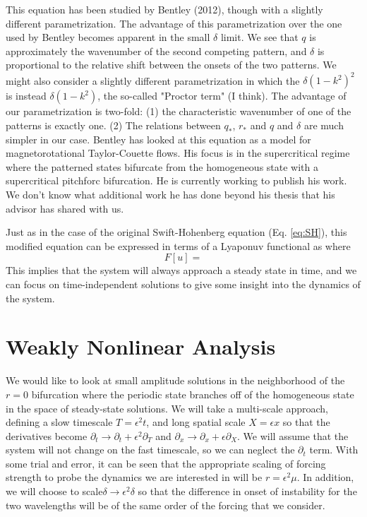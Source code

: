 \documentclass[api,pof,pre,12pt,a4paper]{revtex4-1}
\newcommand{\beqn}{\begin{equation}}
\newcommand{\eeqn}{\end{equation}}
\begin{document}
This equation has been studied by Bentley (2012), though with a slightly different parametrization.  The advantage of this parametrization over the one used by Bentley becomes apparent in the small $\delta$ limit.  We see that $q$ is approximately the wavenumber of the second competing pattern, and $\delta$ is proportional to the relative shift between the onsets of the two patterns.   We might also consider a slightly different parametrization in which the $\delta (1-k^2)^2$ is instead $\delta (1-k^2)$, the so-called "Proctor term" (I think).  The advantage of our parametrization is two-fold: (1) the characteristic wavenumber of one of the patterns is exactly one. (2) The relations between $q_*$, $r_*$ and $q$ and $\delta$ are much simpler in our case.    Bentley has looked at this equation as a model for magnetorotational Taylor-Couette flows.  His focus is in the supercritical regime where the patterned states bifurcate from the homogeneous state with a supercritical pitchforc bifurcation.  He is currently working to publish his work.  We don't know what additional work he has done beyond his thesis that his advisor has shared with us.

Just as in the case of the original Swift-Hohenberg equation (Eq. \ref{eq:SH}), this modified equation can be expressed in terms of a Lyaponuv functional as 
where
\beqn
F[u]=
\eeqn
This implies that the system will always approach a steady state in time, and we can focus on time-independent solutions to give some insight into the dynamics of the system.

\section{Weakly Nonlinear Analysis}
We would like to look at small amplitude solutions in the neighborhood of the $r=0$ bifurcation where the periodic state branches off of the homogeneous state in the space of steady-state solutions.  We will take a multi-scale approach, defining a slow timescale $T=\epsilon^2t$, and long spatial scale $X=\epsilon x$ so that the derivatives become $\partial_t \rightarrow \partial_t+\epsilon^2\partial_T$ and $\partial_x \rightarrow \partial_x+\epsilon\partial_X$.  We will assume that the system will not change on the fast timescale, so we can neglect the $\partial_t$ term. With some trial and error, it can be seen that the appropriate scaling of forcing strength to probe the dynamics we are interested in will be $r=\epsilon^2 \mu$. In addition, we will choose to scale$\delta\rightarrow\epsilon^2 \delta$ so that the difference in onset of instability for the two wavelengths will be of the same order of the forcing that we consider.
\end{document}
